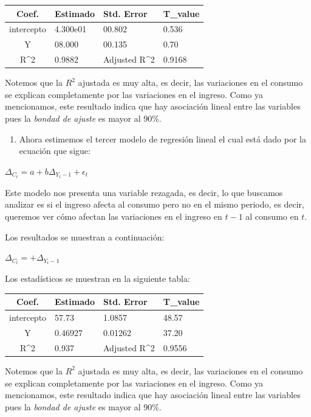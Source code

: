 \documentclass[
]{article}
\providecommand{\tightlist}{%
  \setlength{\itemsep}{0pt}\setlength{\parskip}{0pt}}
\begin{document}
\begin{longtable}[]{@{}clll@{}}
\toprule
\textbf{Coef.} & \textbf{Estimado} & \textbf{Std. Error} &
\textbf{T\_value} \\
\midrule
\endhead
intercepto & 4.300e01 & 00.802 & 0.536 \\
Y & 08.000 & 00.135 & 0.70 \\
R\^{}2 & 0.9882 & Adjusted R\^{}2 & 0.9168 \\
\bottomrule
\end{longtable}

Notemos que la \(R^2\) ajustada es muy alta, es decir, las variaciones
en el consumo se explican completamente por las variaciones en el
ingreso. Como ya mencionamos, este resultado indica que hay asociación
lineal entre las variables pues la \emph{bondad de ajuste} es mayor al
90\%.

\begin{enumerate}
\def\labelenumi{\arabic{enumi}.}
\setcounter{enumi}{2}
\tightlist
\item
  Ahora estimemos el tercer modelo de regresión lineal el cual está dado
  por la ecuación que sigue:
\end{enumerate}

\(\Delta_{C_t}=a+b\Delta_{Y_t-1}+\epsilon_t\)

Este modelo nos presenta una variable rezagada, es decir, lo que
buscamos analizar es si el ingreso afecta al consumo pero no en el mismo
periodo, es decir, queremos ver cómo afectan las variaciones en el
ingreso en \(t-1\) al consumo en \(t\).

Los resultados se muestran a continuación:

\(\Delta_{C_t}=+\Delta_{Y_t-1}\)

Los estadísticos se muestran en la siguiente tabla:

\begin{longtable}[]{@{}clll@{}}
\toprule
\textbf{Coef.} & \textbf{Estimado} & \textbf{Std. Error} &
\textbf{T\_value} \\
\midrule
\endhead
intercepto & 57.73 & 1.0857 & 48.57 \\
Y & 0.46927 & 0.01262 & 37.20 \\
R\^{}2 & 0.937 & Adjusted R\^{}2 & 0.9556 \\
\bottomrule
\end{longtable}

Notemos que la \(R^2\) ajustada es muy alta, es decir, las variaciones
en el consumo se explican completamente por las variaciones en el
ingreso. Como ya mencionamos, este resultado indica que hay asociación
lineal entre las variables pues la \emph{bondad de ajuste} es mayor al
90\%.
\end{document}
